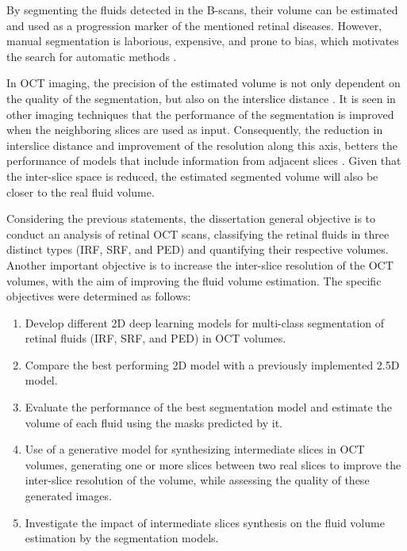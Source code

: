 \par
By segmenting the fluids detected in the B-scans, their volume can be estimated and used as a progression marker of the mentioned retinal diseases. However, manual segmentation is laborious, expensive, and prone to bias, which motivates the search for automatic methods \cite{Viedma2022}. 
\par
In OCT imaging, the precision of the estimated volume is not only dependent on the quality of the segmentation, but also on the interslice distance \cite{Lopez2023}. It is seen in other imaging techniques that the performance of the segmentation is improved when the neighboring slices are used as input. Consequently, the reduction in interslice distance and improvement of the resolution along this axis, betters the performance of models that include information from adjacent slices \cite{Selvi2013}. Given that the inter-slice space is reduced, the estimated segmented volume will also be closer to the real fluid volume.
\par
Considering the previous statements, the dissertation general objective is to conduct an analysis of retinal OCT scans, classifying the retinal fluids in three distinct types (IRF, SRF, and PED) and quantifying their respective volumes. Another important objective is to increase the inter-slice resolution of the OCT volumes, with the aim of improving the fluid volume estimation. The specific objectives were determined as follows:  
\begin{enumerate}
	\item Develop different 2D deep learning models for multi-class segmentation of retinal fluids (IRF, SRF, and PED) in OCT volumes.
	\item Compare the best performing 2D model with a previously implemented 2.5D model.
	\item Evaluate the performance of the best segmentation model and estimate the volume of each fluid using the masks predicted by it.
	\item Use of a generative model for synthesizing intermediate slices in OCT volumes, generating one or more slices between two real slices to improve the inter-slice resolution of the volume, while assessing the quality of these generated images.
	\item Investigate the impact of intermediate slices synthesis on the fluid volume estimation by the segmentation models. 
\end{enumerate}
\par
